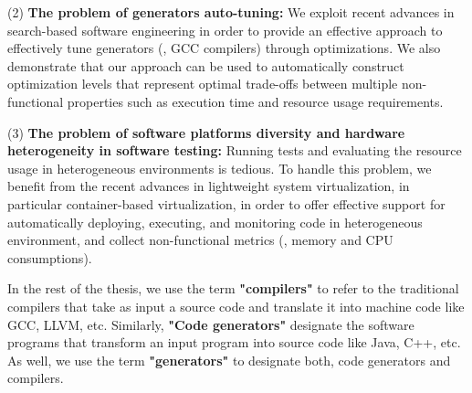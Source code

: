 	(2) \textbf{The problem of generators auto-tuning:}  
	We exploit recent advances in search-based software engineering in order to provide an effective approach to effectively tune generators (\eg, GCC compilers) through optimizations. We also demonstrate that our approach can be used to automatically construct optimization levels that represent optimal trade-offs between multiple non-functional properties such as execution time and resource usage requirements. 

	(3) \textbf{The problem of software platforms diversity and hardware heterogeneity in software testing:} Running tests and evaluating the resource usage in heterogeneous environments is tedious. To handle this problem, we benefit from the recent advances in lightweight system virtualization, in particular container-based virtualization, in order to offer effective support for automatically deploying, executing, and monitoring code in heterogeneous environment, and collect non-functional metrics (\eg, memory and CPU consumptions).
	

In the rest of the thesis, we use the term \textbf{"compilers"} to refer to the traditional compilers that take as input a source code and translate it into machine code like GCC, LLVM, etc. Similarly, \textbf{"Code generators"} designate the software programs that transform an input program into source code like Java, C++, etc. As well, we use the term \textbf{"generators"} to designate both, code generators and compilers. 

